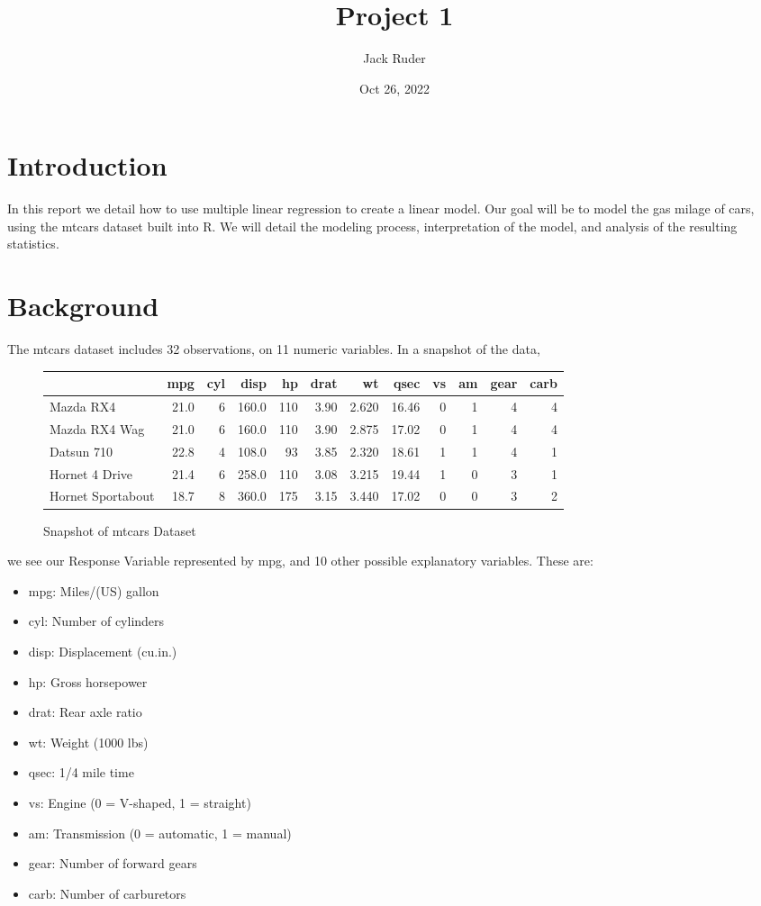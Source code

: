 \documentclass[a4paper]{article}
\title{Project 1}
\date{Oct 26, 2022}
\author{Jack Ruder}
\begin{document}
\doublespacing
\maketitle


\section{Introduction}
In this report we detail how to use multiple linear regression to create a linear model. Our goal will be to model the gas milage of cars, using the mtcars dataset built into R. We will detail the modeling process, interpretation of the model, and analysis of the resulting statistics. 

\section{Background}
The mtcars dataset includes 32 observations, on 11 numeric variables. In a snapshot of the data,
\begin{figure}[H]
\centering
	\begin{tabular}{l|r|r|r|r|r|r|r|r|r|r|r}
	\hline
	  & mpg & cyl & disp & hp & drat & wt & qsec & vs & am & gear & carb\\
	\hline
	Mazda RX4 & 21.0 & 6 & 160.0 & 110 & 3.90 & 2.620 & 16.46 & 0 & 1 & 4 & 4\\
	\hline
	Mazda RX4 Wag & 21.0 & 6 & 160.0 & 110 & 3.90 & 2.875 & 17.02 & 0 & 1 & 4 & 4\\
	\hline
	Datsun 710 & 22.8 & 4 & 108.0 & 93 & 3.85 & 2.320 & 18.61 & 1 & 1 & 4 & 1\\
	\hline
	Hornet 4 Drive & 21.4 & 6 & 258.0 & 110 & 3.08 & 3.215 & 19.44 & 1 & 0 & 3 & 1\\
	\hline
	Hornet Sportabout & 18.7 & 8 & 360.0 & 175 & 3.15 & 3.440 & 17.02 & 0 & 0 & 3 & 2\\
	\hline
	\end{tabular}
	\caption{Snapshot of mtcars Dataset}
	\label{fig:mtcars-snap}
\end{figure}
we see our Response Variable represented by mpg, and 10 other possible explanatory variables. These are:
\begin{itemize}
	\item mpg: Miles/(US) gallon
	\item cyl:   Number of cylinders                      
	\item disp:  Displacement (cu.in.)                    
	\item hp:    Gross horsepower                         
	\item drat:  Rear axle ratio                          
	\item wt:    Weight (1000 lbs)                        
	\item qsec:  1/4 mile time                            
	\item vs:    Engine (0 = V-shaped, 1 = straight)      
	\item am:    Transmission (0 = automatic, 1 = manual) 
	\item gear:  Number of forward gears                  
	\item carb:  Number of carburetors                    
\end{itemize}
\end{document}
